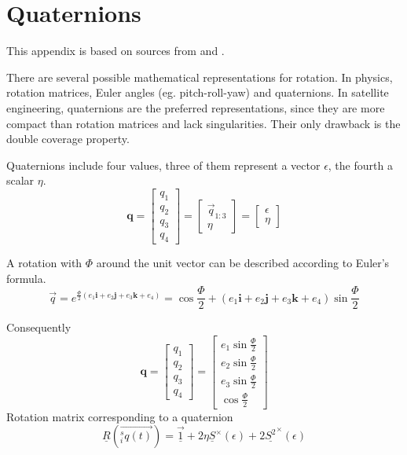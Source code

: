 \chapter{Quaternions } \label{chap:A}
This appendix is based on sources from \cite{SADC} and \cite{Kui}.

There are several possible mathematical representations for rotation. In physics, rotation matrices, Euler angles (eg. pitch-roll-yaw) and quaternions. In satellite engineering, quaternions are the preferred representations, since they are more compact than rotation matrices and lack singularities. Their only drawback is the double coverage property.

Quaternions include four values, three of them represent a vector \textbf{$\epsilon$}, the fourth a scalar $\eta$. 
\begin{equation}
\textbf{q} =
\left[ 
\begin{array}{cccc}
q_1 \\
q_2 \\  
q_3 \\
q_4 
\end{array}
\right] 
= 
\left[ 
\begin{array}{cccc}
\vec{q}_{1:3} \\
\eta
\end{array}
\right]
=
\left[ 
\begin{array}{cccc}
\textbf{$\epsilon$} \\
\eta
\end{array}
\right] 
\end{equation}

A rotation with $\Phi$ around the unit vector can be described according to Euler's formula.
\begin{equation}
\vec q = e^{\frac{\Phi}{2} (e_1 \textbf{i}+ e_2 \textbf{j} + e_3 \textbf{k} + e_4)} = \cos \frac{\Phi}{2} + (e_1 \textbf{i}+ e_2 \textbf{j} + e_3 \textbf{k} +e_4) \sin \frac{\Phi}{2}
\end{equation}

Consequently 
\begin{equation}
\textbf{q} =
\left[ 
\begin{array}{cccc}
q_1 \\
q_2 \\  
q_3 \\
q_4 
\end{array}
\right] 
= 
\left[ 
\begin{array}{cccc}
e_1  \sin \frac{\Phi}{2} \\
e_2  \sin \frac{\Phi}{2} \\  
e_3  \sin \frac{\Phi}{2} \\
\cos \frac{\Phi}{2} 
\end{array}
\right] 
\end{equation}
Rotation matrix corresponding to a quaternion
\begin{equation}
\underline{R}(\vec{^s_i q(t)}) = \underline{\vec 1} + 2 \eta \underline{S} ^\times (\epsilon) + 2 \underline{S^2} ^\times (\epsilon) 
\end{equation}

